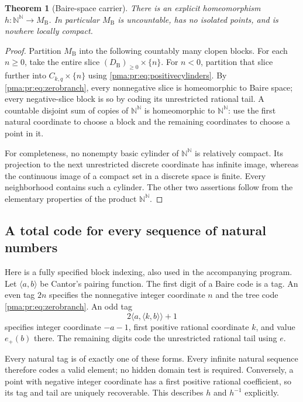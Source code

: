 \documentclass[11pt]{article}
\numberwithin{equation}{section}
\newtheorem{theorem}{Theorem}[section]
\theoremstyle{definition}
\theoremstyle{remark}
\newcommand{\N}{\mathbb N}
\newcommand{\Baire}{\N^{\N}}
\newcommand{\MB}{M_{\mathrm B}}
\begin{document}
\begin{theorem}[Baire-space carrier]
\label{pma:pr:thm:baire}
There is an explicit homeomorphism $h:\Baire\to\MB$.
In particular $\MB$ is uncountable, has no isolated points, and is
nowhere locally compact.
\end{theorem}
\begin{proof}
Partition $\MB$ into the following countably many clopen blocks. For each
$n\geq0$, take the entire slice
$(D_{\mathrm B})_{\geq0}\times\{n\}$. For $n<0$, partition that slice
further into $C_{k,q}\times\{n\}$ using
\eqref{pma:pr:eq:positivecylinders}. By \eqref{pma:pr:eq:zerobranch}, every nonnegative
slice is homeomorphic to Baire space; every negative-slice block is so
by coding its unrestricted rational tail. A countable disjoint sum of
copies of $\Baire$ is homeomorphic to $\Baire$: use the first natural
coordinate to choose a block and the remaining coordinates to choose a
point in it.

For completeness, no nonempty basic cylinder of $\Baire$ is relatively
compact. Its projection to the next unrestricted discrete coordinate
has infinite image, whereas the continuous image of a compact set in a
discrete space is finite. Every neighborhood contains such a cylinder.
The other two assertions follow from the elementary properties of the
product $\N^{\N}$.
\end{proof}

\subsection{A total code for every sequence of natural numbers}

Here is a fully specified block indexing, also used in the accompanying
program. Let $\langle a,b\rangle$ be Cantor's pairing function.
The first digit of a Baire code is a tag. An even tag $2n$ specifies the
nonnegative integer coordinate $n$ and the tree code
\eqref{pma:pr:eq:zerobranch}. An odd tag
\begin{equation}
 2\langle a,\langle k,b\rangle\rangle+1
 \label{pma:pr:eq:tag}
\end{equation}
specifies integer coordinate $-a-1$, first positive rational coordinate
$k$, and value $e_+(b)$ there. The remaining digits code the unrestricted
rational tail using $e$.

Every natural tag is of exactly one of these forms. Every infinite
natural sequence therefore codes a valid element; no hidden domain test
is required. Conversely, a point with negative integer coordinate has a
first positive rational coefficient, so its tag and tail are uniquely
recoverable. This describes $h$ and $h^{-1}$ explicitly.
\end{document}
